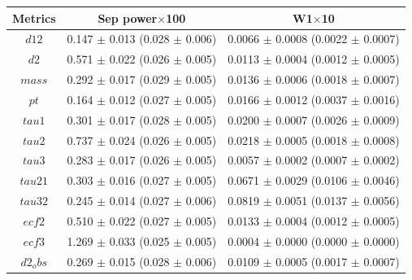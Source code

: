 \begin{ruledtabular}
  \begin{tabular}{ccc}
  \textbf{Metrics} & \textbf{Sep power}$\times$100 & \textbf{W1}$\times$10 \\
  \hline
  \textbf{$d12$} & 0.147 $\pm$ 0.013 (0.028 $\pm$ 0.006) & 0.0066 $\pm$ 0.0008 (0.0022 $\pm$ 0.0007) \\
  \textbf{$d2$} & 0.571 $\pm$ 0.022 (0.026 $\pm$ 0.005) & 0.0113 $\pm$ 0.0004 (0.0012 $\pm$ 0.0005) \\
  \textbf{$mass$} & 0.292 $\pm$ 0.017 (0.029 $\pm$ 0.005) & 0.0136 $\pm$ 0.0006 (0.0018 $\pm$ 0.0007) \\
  \textbf{$pt$} & 0.164 $\pm$ 0.012 (0.027 $\pm$ 0.005) & 0.0166 $\pm$ 0.0012 (0.0037 $\pm$ 0.0016) \\
  \textbf{$tau1$} & 0.301 $\pm$ 0.017 (0.028 $\pm$ 0.005) & 0.0200 $\pm$ 0.0007 (0.0026 $\pm$ 0.0009) \\
  \textbf{$tau2$} & 0.737 $\pm$ 0.024 (0.026 $\pm$ 0.005) & 0.0218 $\pm$ 0.0005 (0.0018 $\pm$ 0.0008) \\
  \textbf{$tau3$} & 0.283 $\pm$ 0.017 (0.026 $\pm$ 0.005) & 0.0057 $\pm$ 0.0002 (0.0007 $\pm$ 0.0002) \\
  \textbf{$tau21$} & 0.303 $\pm$ 0.016 (0.027 $\pm$ 0.005) & 0.0671 $\pm$ 0.0029 (0.0106 $\pm$ 0.0046) \\
  \textbf{$tau32$} & 0.245 $\pm$ 0.014 (0.027 $\pm$ 0.006) & 0.0819 $\pm$ 0.0051 (0.0137 $\pm$ 0.0056) \\
  \textbf{$ecf2$} & 0.510 $\pm$ 0.022 (0.027 $\pm$ 0.005) & 0.0133 $\pm$ 0.0004 (0.0012 $\pm$ 0.0005) \\
  \textbf{$ecf3$} & 1.269 $\pm$ 0.033 (0.025 $\pm$ 0.005) & 0.0004 $\pm$ 0.0000 (0.0000 $\pm$ 0.0000) \\
  \textbf{$d2_obs$} & 0.269 $\pm$ 0.015 (0.028 $\pm$ 0.006) & 0.0109 $\pm$ 0.0005 (0.0017 $\pm$ 0.0007) \\
  \end{tabular}
\end{ruledtabular}